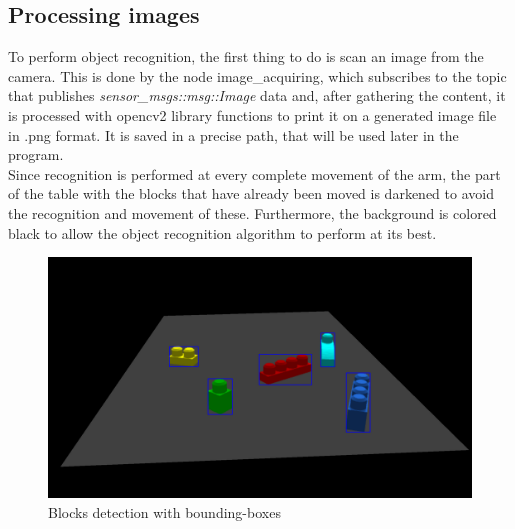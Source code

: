 \documentclass[12pt,a4paper]{article}
\begin{document}
\subsection{Processing images}\label{subsec:imageproc}
To perform object recognition, the first thing to do is scan an image from the camera. This is done by the node image\_acquiring, which subscribes to the topic that publishes \textit{sensor\_msgs::msg::Image} data and, after gathering the content, it is processed with opencv2 library functions to print it on a generated image file in .png format. It is saved in a precise path, that will be used later in the program.\\Since recognition is performed at every complete movement of the arm, the part of the table with the blocks that have already been moved is darkened to avoid the recognition and movement of these. Furthermore, the background is colored black to allow the object recognition algorithm to perform at its best.
\begin{center}
    \begin{figure}
        \centering
        \includegraphics[width=1.0\columnwidth]{images/Yolo1.png}
        \caption{Blocks detection with bounding-boxes}
        \label{fig:yolo1}
    \end{figure}
\end{center}
\end{document}
